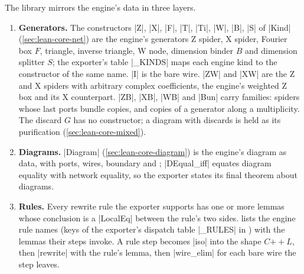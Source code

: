 The library mirrors the engine's data in three layers.
\begin{enumerate}
\item \textbf{Generators.} The constructors \lean|Z|, \lean|X|, \lean|F|, \lean|T|, \lean|Ti|,
  \lean|W|, \lean|B|, \lean|S| of \lean|Kind| (\cref{sec:lean-core-net}) are the engine's
  generators Z spider, X spider, Fourier box $F$, triangle, inverse triangle, W node, dimension
  binder $B$ and dimension splitter $S$; the exporter's table \py|_KINDS| maps each engine kind to
  the constructor of the same name. \lean|I| is the bare wire. \lean|ZW| and \lean|XW| are the
  Z and X spiders with arbitrary complex coefficients, the engine's weighted Z box and its X
  counterpart. \lean|ZB|, \lean|XB|, \lean|WB| and \lean|Bun| carry \bbox{} families: spiders whose
  last ports bundle copies, and copies of a generator along a multiplicity. The discard $G$ has no
  constructor; a diagram with discards is held as its purification (\cref{sec:lean-core-mixed}).
\item \textbf{Diagrams.} \lean|Diagram| (\cref{sec:lean-core-diagram}) is the engine's diagram
  as data, with ports, wires, boundary and \bboxes; \lean|DEqual_iff| equates diagram equality with
  network equality, so the exporter states its final theorem about diagrams.
\item \textbf{Rules.} Every rewrite rule the exporter supports has one or more lemmas whose
  conclusion is a \lean|LocalEq| between the rule's two sides.  lists
  the engine rule names (keys of the exporter's dispatch table \py|_RULES| in
  ) with the lemmas their steps invoke. A rule step becomes
  \lean|iso| into the shape $C\mathbin{+\!\!+}L$, then \lean|rewrite| with the rule's lemma, then
  \lean|wire_elim| for each bare wire the step leaves.
\end{enumerate}

